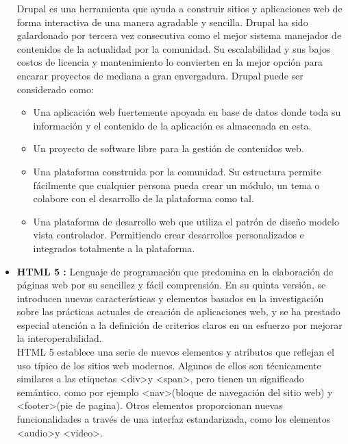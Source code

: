 \documentclass[letterpaper, 11pt, oneside]{article}
\theoremstyle{definition}
\theoremstyle{remark}
\begin{document}
\begin{itemize}
Drupal es una herramienta que ayuda a construir sitios y aplicaciones web de forma interactiva de una manera agradable y sencilla. Drupal ha sido galardonado por tercera vez consecutiva como el mejor sistema manejador de contenidos de la actualidad por la comunidad. Su escalabilidad y sus bajos costos de licencia y mantenimiento lo convierten en la mejor opción para encarar proyectos de mediana a gran envergadura. Drupal puede ser considerado como:
\begin{itemize}
\item Una aplicación web fuertemente apoyada en base de datos donde toda su información y el contenido de la aplicación es almacenada en esta.
\item Un proyecto de software libre para la gestión de contenidos web.
\item Una plataforma construida por la comunidad. Su estructura permite fácilmente que cualquier persona pueda crear un módulo, un tema o colabore con el desarrollo de la plataforma como tal.
\item Una plataforma de desarrollo web que utiliza el patrón de diseño modelo vista controlador. Permitiendo crear desarrollos personalizados e integrados totalmente a la plataforma.
\end{itemize}

\item \textbf{HTML 5 :} \cite{HTML5} Lenguaje de programación que predomina en la elaboración de páginas web por su sencillez y fácil comprensión. En su quinta versión, se introducen nuevas características y elementos basados en la investigación sobre las prácticas actuales de creación de aplicaciones web, y se ha prestado especial atención a la definición de criterios claros en un esfuerzo por mejorar la interoperabilidad.\\

HTML 5 establece una serie de nuevos elementos y atributos que reflejan el uso típico de los sitios web modernos. Algunos de ellos son técnicamente similares a las etiquetas \textless div\textgreater y \textless span\textgreater, pero tienen un significado semántico, como por ejemplo \textless nav\textgreater (bloque de navegación del sitio web) y \textless footer\textgreater (pie de pagina). Otros elementos proporcionan nuevas funcionalidades a través de una interfaz estandarizada, como los elementos \textless audio\textgreater y \textless video\textgreater.\\


\end{itemize}
\end{document}
